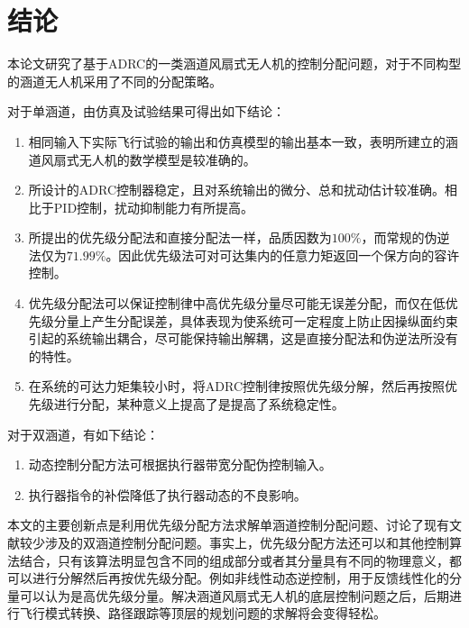 
\chapter{结\quad 论}
本论文研究了基于ADRC的一类涵道风扇式无人机的控制分配问题，对于不同构型的涵道无人机采用了不同的分配策略。

对于单涵道，由仿真及试验结果可得出如下结论：
\begin{enumerate}
	\item 相同输入下实际飞行试验的输出和仿真模型的输出基本一致，表明所建立的涵道风扇式无人机的数学模型是较准确的。	
	\item 所设计的ADRC控制器稳定，且对系统输出的微分、总和扰动估计较准确。相比于PID控制，扰动抑制能力有所提高。
	\item 所提出的优先级分配法和直接分配法一样，品质因数为$ 100\% $，而常规的伪逆法仅为$ 71.99\% $。因此优先级法可对可达集内的任意力矩返回一个保方向的容许控制。
	\item 优先级分配法可以保证控制律中高优先级分量尽可能无误差分配，而仅在低优先级分量上产生分配误差，具体表现为使系统可一定程度上防止因操纵面约束引起的系统输出耦合，尽可能保持输出解耦，这是直接分配法和伪逆法所没有的特性。
	\item 在系统的可达力矩集较小时，将ADRC控制律按照优先级分解，然后再按照优先级进行分配，某种意义上提高了是提高了系统稳定性。	
\end{enumerate}
对于双涵道，有如下结论：
\begin{enumerate}
	\item 动态控制分配方法可根据执行器带宽分配伪控制输入。	
	\item 执行器指令的补偿降低了执行器动态的不良影响。
\end{enumerate}

本文的主要创新点是利用优先级分配方法求解单涵道控制分配问题、讨论了现有文献较少涉及的双涵道控制分配问题。事实上，优先级分配方法还可以和其他控制算法结合，只有该算法明显包含不同的组成部分或者其分量具有不同的物理意义，都可以进行分解然后再按优先级分配。例如非线性动态逆控制，用于反馈线性化的分量可以认为是高优先级分量。解决涵道风扇式无人机的底层控制问题之后，后期进行飞行模式转换、路径跟踪等顶层的规划问题的求解将会变得轻松。

